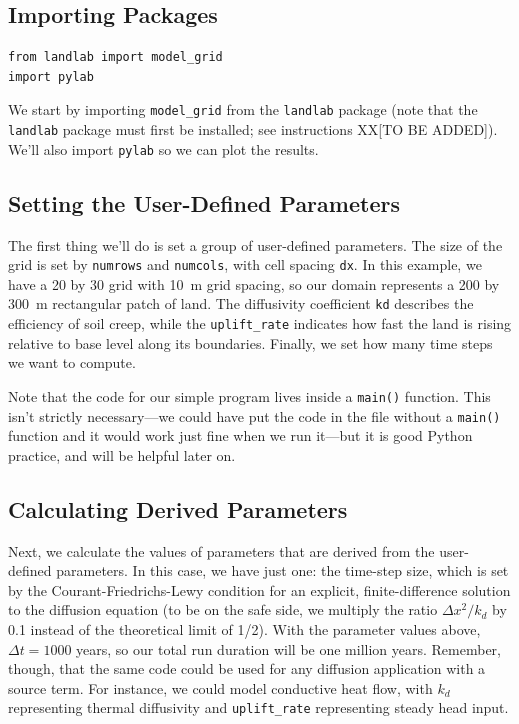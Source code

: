 \documentclass[12pt]{article}
\newcommand{\code}[1]{{\tt #1}}
\begin{document}
\newpage
\subsection{Importing Packages}

\begin{lstlisting}[firstnumber=11]
from landlab import model_grid
import pylab
\end{lstlisting}

We start by importing {\tt model\_grid} from the {\tt landlab} package (note that the {\tt landlab} package must first be installed; see instructions XX[TO BE ADDED]). We'll also import {\tt pylab} so we can plot the results.


\subsection{Setting the User-Defined Parameters}



The first thing we'll do is set a group of user-defined parameters. The size of the grid is set by \code{numrows} and \code{numcols}, with cell spacing \code{dx}. In this example, we have a 20 by 30 grid with 10~m grid spacing, so our domain represents a 200 by 300~m rectangular patch of land. The diffusivity coefficient \code{kd} describes the efficiency of soil creep, while the \code{uplift\_rate} indicates how fast the land is rising relative to base level along its boundaries. Finally, we set how many time steps we want to compute.

Note that the code for our simple program lives inside a \code{main()} function. This isn't strictly necessary---we could have put the code in the file without a \code{main()} function and it would work just fine when we run it---but it is good Python practice, and will be helpful later on.

\break
\subsection{Calculating Derived Parameters}



Next, we calculate the values of parameters that are derived from the user-defined parameters. In this case, we have just one: the time-step size, which is set by the Courant-Friedrichs-Lewy condition for an explicit, finite-difference solution to the diffusion equation (to be on the safe side, we multiply the ratio $\Delta x^2 / k_d$ by 0.1 instead of the theoretical limit of 1/2). With the parameter values above, $\Delta t = 1000$ years, so our total run duration will be one million years. Remember, though, that the same code could be used for any diffusion application with a source term. For instance, we could model conductive heat flow, with $k_d$ representing thermal diffusivity and \code{uplift\_rate} representing steady head input.
\end{document}
